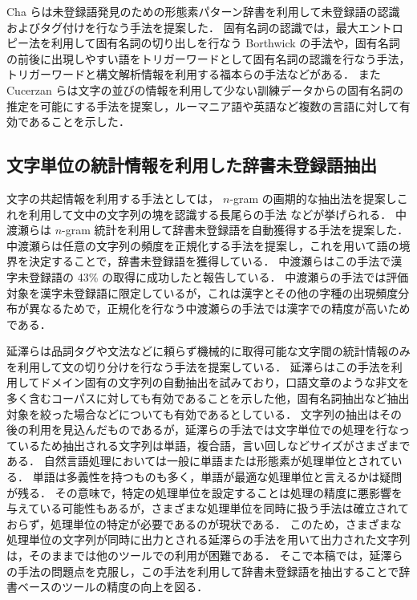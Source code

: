 Cha らは未登録語発見のための形態素パターン辞書を利用して未登録語の認識およびタグ付けを行なう手法を提案した\cite{cha98}．
固有名詞の認識では，最大エントロピー法を利用して固有名詞の切り出しを行なう Borthwick の手法\cite{borthwick99}や，固有名詞の前後に出現しやすい語をトリガーワードとして固有名詞の認識を行なう手法\cite{kitani94,hisamitsu97}，トリガーワードと構文解析情報を利用する福本らの手法\cite{fukumoto98}などがある．
また Cucerzan らは文字の並びの情報を利用して少ない訓練データからの固有名詞の推定を可能にする手法を提案し，ルーマニア語や英語など複数の言語に対して有効であることを示した\cite{cucerzan99}．
\subsection{文字単位の統計情報を利用した辞書未登録語抽出}
文字の共起情報を利用する手法としては， $n$-gram の画期的な抽出法を提案しこれを利用して文中の文字列の塊を認識する長尾らの手法\cite{nagao94} などが挙げられる．
中渡瀬らは $n$-gram 統計を利用して辞書未登録語を自動獲得する手法を提案した\cite{nakawatase98}．
中渡瀬らは任意の文字列の頻度を正規化する手法を提案し，これを用いて語の境界を決定することで，辞書未登録語を獲得している．
中渡瀬らはこの手法で漢字未登録語の 43\% の取得に成功したと報告している．
中渡瀬らの手法では評価対象を漢字未登録語に限定しているが，これは漢字とその他の字種の出現頻度分布が異なるためで，正規化を行なう中渡瀬らの手法では漢字での精度が高いためである．

延澤らは品詞タグや文法などに頼らず機械的に取得可能な文字間の統計情報のみを利用して文の切り分けを行なう手法を提案している\cite{nobesawa96coling}．
延澤らはこの手法を利用してドメイン固有の文字列の自動抽出を試みており，口語文章のような非文を多く含むコーパスに対しても有効であることを示した\cite{nobesawa00coling,nobesawa01anlp}他，固有名詞抽出など抽出対象を絞った場合などについても有効であるとしている\cite{nobesawa99}．
文字列の抽出はその後の利用を見込んだものであるが，延澤らの手法では文字単位での処理を行なっているため抽出される文字列は単語，複合語，言い回しなどサイズがさまざまである．
自然言語処理においては一般に単語または形態素が処理単位とされている．
単語は多義性を持つものも多く，単語が最適な処理単位と言えるかは疑問が残る\cite{fung98}．
その意味で，特定の処理単位を設定することは処理の精度に悪影響を与えている可能性もあるが，さまざまな処理単位を同時に扱う手法は確立されておらず，処理単位の特定が必要であるのが現状である．
このため，さまざまな処理単位の文字列が同時に出力とされる延澤らの手法を用いて出力された文字列は，そのままでは他のツールでの利用が困難である．
そこで本稿では，延澤らの手法の問題点を克服し，この手法を利用して辞書未登録語を抽出することで辞書ベースのツールの精度の向上を図る．

